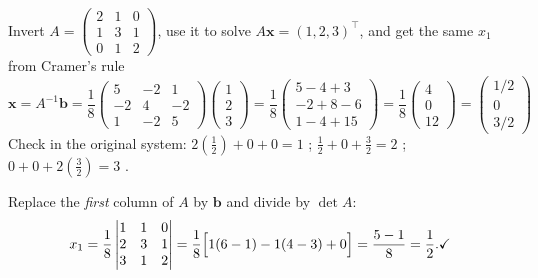 \begin{worked}{Invert $A=\begin{pmatrix}2&1&0\\1&3&1\\0&1&2\end{pmatrix}$, use it to solve $A\mathbf x=(1,2,3)^{\!\top}$, and get the same $x_{1}$ from Cramer's rule}
\[
  \mathbf x=A^{-1}\mathbf b
  =\frac18\begin{pmatrix}5&-2&1\\-2&4&-2\\1&-2&5\end{pmatrix}
   \begin{pmatrix}1\\2\\3\end{pmatrix}
  =\frac18\begin{pmatrix}5-4+3\\-2+8-6\\1-4+15\end{pmatrix}
  =\frac18\begin{pmatrix}4\\0\\12\end{pmatrix}
  =\boxed{\begin{pmatrix}1/2\\0\\3/2\end{pmatrix}}
\]
Check in the original system: $2(\tfrac12)+0+0=1$ \checkmark;
$\tfrac12+0+\tfrac32=2$ \checkmark; $0+0+2(\tfrac32)=3$ \checkmark.

Replace the \emph{first} column of $A$ by $\mathbf b$ and divide by
$\det A$:
\[
  x_{1}=\frac{1}{8}\begin{vmatrix}1&1&0\\2&3&1\\3&1&2\end{vmatrix}
  =\frac{1}{8}\Bigl[1(6-1)-1(4-3)+0\Bigr]
  =\frac{5-1}{8}=\frac12 . \checkmark
\]


\end{worked}
